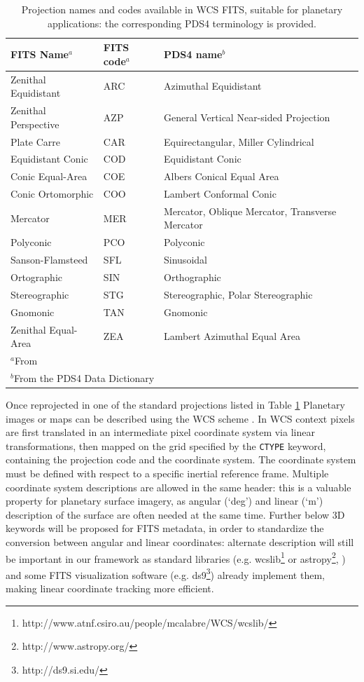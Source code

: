 \begin{table}
\caption{Projection names and codes available in WCS FITS, suitable for
planetary applications: the corresponding PDS4 terminology is
provided.}
\centering
\begin{tabular}{l l l}
\hline
FITS Name$^{a}$ & FITS code$^{a}$ & PDS4 name$^{b}$ \\ 
\hline
Zenithal Equidistant & ARC & Azimuthal Equidistant \\
Zenithal Perspective & AZP & General Vertical Near-sided Projection \\
Plate Carre & CAR & Equirectangular, Miller Cylindrical \\
Equidistant Conic & COD & Equidistant Conic \\
Conic Equal-Area & COE & Albers Conical Equal Area \\ 
Conic Ortomorphic & COO & Lambert Conformal Conic\\
Mercator & MER & Mercator, Oblique Mercator, Transverse Mercator \\
Polyconic & PCO & Polyconic \\
Sanson-Flamsteed & SFL & Sinusoidal \\
Ortographic & SIN & Orthographic \\
Stereographic & STG & Stereographic, Polar Stereographic \\
Gnomonic & TAN & Gnomonic \\
Zenithal Equal-Area & ZEA & Lambert Azimuthal Equal Area \\
\hline
\multicolumn{3}{l}{$^{a}$From \citet{calagreisenI}} \\
\multicolumn{3}{l}{$^{b}$From the PDS4 Data Dictionary}
\end{tabular}
\label{table:proj}
\end{table}

Once reprojected in one of the standard projections listed in Table \ref{table:proj}
Planetary images or maps can be described using the WCS scheme
\citep{greisencalaII,calagreisenI}.
In WCS context pixels are first translated in an intermediate pixel coordinate system
via linear transformations, then mapped on the grid specified by the \texttt{CTYPE}
keyword, containing the projection code and the coordinate system.
The coordinate system must be defined with respect to a specific inertial reference frame.
Multiple coordinate system descriptions are allowed in the same header: this is a
valuable property for planetary surface imagery, as angular (`deg') and linear (`m')
description of the surface are often needed at the same time.
Further below 3D keywords will be proposed for FITS metadata, in order to standardize
the conversion between angular and linear coordinates: alternate description will still
be important in our framework as standard libraries (e.g.
wcslib\footnote{http://www.atnf.csiro.au/people/mcalabre/WCS/wcslib/} or
astropy\footnote{http://www.astropy.org/}, \citet{astropy}) and some FITS visualization
software (e.g. ds9\footnote{http://ds9.si.edu/}) already implement them, making linear
coordinate tracking more efficient.  

